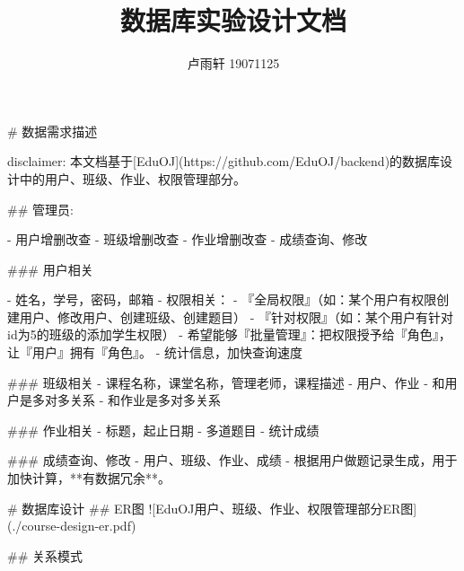 \documentclass{ctexart}
\title{数据库实验设计文档}
\author{卢雨轩 19071125}
\begin{document}
\maketitle

\begin{markdown}
# 数据需求描述

disclaimer: 本文档基于[EduOJ](https://github.com/EduOJ/backend)的数据库设计中的用户、班级、作业、权限管理部分。

## 管理员:

- 用户增删改查
- 班级增删改查
- 作业增删改查
- 成绩查询、修改

### 用户相关

- 姓名，学号，密码，邮箱
- 权限相关：
    - 『全局权限』（如：某个用户有权限创建用户、修改用户、创建班级、创建题目）
    - 『针对权限』（如：某个用户有针对id为5的班级的添加学生权限）
    - 希望能够『批量管理』：把权限授予给『角色』，让『用户』拥有『角色』。
- 统计信息，加快查询速度

### 班级相关
- 课程名称，课堂名称，管理老师，课程描述
- 用户、作业
    - 和用户是多对多关系
    - 和作业是多对多关系

### 作业相关
- 标题，起止日期
- 多道题目
- 统计成绩

### 成绩查询、修改
- 用户、班级、作业、成绩
- 根据用户做题记录生成，用于加快计算，**有数据冗余**。

# 数据库设计
## ER图
![EduOJ用户、班级、作业、权限管理部分ER图](./course-design-er.pdf)

## 关系模式


\end{markdown}
\end{document}
